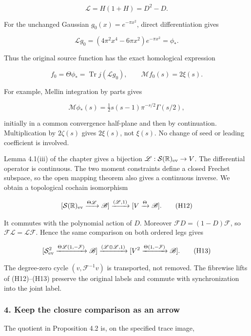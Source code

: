 \[
\mathscr L=H(1+H)=D^2-D.
\tag{H8}
\]

For the unchanged Gaussian \(g_0(x)=e^{-\pi x^2}\), direct differentiation gives

\[
\boxed{\mathscr Lg_0=(4\pi^2x^4-6\pi x^2)e^{-\pi x^2}=\phi_*.}
\tag{H9}
\]

Thus the original source function has the exact homological expression

\[
f_0=\Theta\phi_*=\operatorname{Tr}j(\mathscr Lg_0),\qquad \mathcal Mf_0(s)=2\xi(s).
\tag{H10}
\]

For example, Mellin integration by parts gives

\[
\mathcal M\phi_*(s)=\tfrac12s(s-1)\pi^{-s/2}\Gamma(s/2),
\tag{H11}
\]

initially in a common convergence half-plane and then by continuation. Multiplication by \(2\zeta(s)\) gives \(2\xi(s)\), not \(\xi(s)\). No change of seed or leading coefficient is involved.

Lemma 4.1(iii) of the chapter gives a bijection \(\mathscr L:\mathcal S(\mathbb R)_{\rm ev}\to V\). The differential operator is continuous. The two moment constraints define a closed Frechet subspace, so the open mapping theorem also gives a continuous inverse. We obtain a topological cochain isomorphism

\[
[\mathcal S(\mathbb R)_{\rm ev}\xrightarrow{\Theta\mathscr L}\mathscr B]
\xrightarrow{(\mathscr L,1)}[V\xrightarrow\Theta\mathscr B].
\tag{H12}
\]

It commutes with the polynomial action of \(D\). Moreover \(\mathcal FD=(1-D)\mathcal F\), so \(\mathcal F\mathscr L=\mathscr L\mathcal F\). Hence the same comparison on both ordered legs gives

\[
[\mathcal S_{\rm ev}^2\xrightarrow{\Theta\mathscr L(1,-\mathcal F)}\mathscr B]
\xrightarrow{(\mathscr L\oplus\mathscr L,1)}
[V^2\xrightarrow{\Theta(1,-\mathcal F)}\mathscr B].
\tag{H13}
\]

The degree-zero cycle \((v,\mathcal F^{-1}v)\) is transported, not removed. The fibrewise lifts of (H12)--(H13) preserve the original labels and commute with synchronization into the joint label.

\subsubsection{4. Keep the closure comparison as an arrow}\label{endpoint-cc_hochschild--keep-the-closure-comparison-as-an-arrow}

The quotient in Proposition 4.2 is, on the specified trace image,

